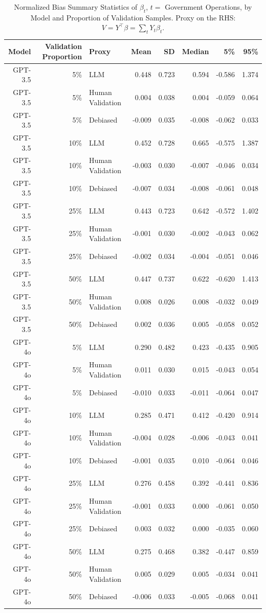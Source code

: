 \begin{table}

\caption{Normalized Bias Summary Statistics of $\beta_{t}$, $t=$ Government Operations, by Model and Proportion of Validation Samples.
      Proxy on the RHS: $V = Y^\top \beta = \sum_{t} Y_t \beta_t$.}
\centering
\begin{tabular}[t]{rrlrrrrr}
\toprule
Model & Validation Proportion & Proxy & Mean & SD & Median & 5\% & 95\%\\
\midrule
GPT-3.5 & 5\% & LLM & 0.448 & 0.723 & 0.594 & -0.586 & 1.374\\
GPT-3.5 & 5\% & Human Validation & 0.004 & 0.038 & 0.004 & -0.059 & 0.064\\
GPT-3.5 & 5\% & Debiased & -0.009 & 0.035 & -0.008 & -0.062 & 0.033\\
GPT-3.5 & 10\% & LLM & 0.452 & 0.728 & 0.665 & -0.575 & 1.387\\
GPT-3.5 & 10\% & Human Validation & -0.003 & 0.030 & -0.007 & -0.046 & 0.034\\
GPT-3.5 & 10\% & Debiased & -0.007 & 0.034 & -0.008 & -0.061 & 0.048\\
GPT-3.5 & 25\% & LLM & 0.443 & 0.723 & 0.642 & -0.572 & 1.402\\
GPT-3.5 & 25\% & Human Validation & -0.001 & 0.030 & -0.002 & -0.043 & 0.062\\
GPT-3.5 & 25\% & Debiased & -0.002 & 0.034 & -0.004 & -0.051 & 0.046\\
GPT-3.5 & 50\% & LLM & 0.447 & 0.737 & 0.622 & -0.620 & 1.413\\
GPT-3.5 & 50\% & Human Validation & 0.008 & 0.026 & 0.008 & -0.032 & 0.049\\
GPT-3.5 & 50\% & Debiased & 0.002 & 0.036 & 0.005 & -0.058 & 0.052\\
GPT-4o & 5\% & LLM & 0.290 & 0.482 & 0.423 & -0.435 & 0.905\\
GPT-4o & 5\% & Human Validation & 0.011 & 0.030 & 0.015 & -0.043 & 0.054\\
GPT-4o & 5\% & Debiased & -0.010 & 0.033 & -0.011 & -0.064 & 0.047\\
GPT-4o & 10\% & LLM & 0.285 & 0.471 & 0.412 & -0.420 & 0.914\\
GPT-4o & 10\% & Human Validation & -0.004 & 0.028 & -0.006 & -0.043 & 0.041\\
GPT-4o & 10\% & Debiased & -0.001 & 0.035 & 0.010 & -0.064 & 0.046\\
GPT-4o & 25\% & LLM & 0.276 & 0.458 & 0.392 & -0.441 & 0.836\\
GPT-4o & 25\% & Human Validation & -0.001 & 0.033 & 0.000 & -0.061 & 0.050\\
GPT-4o & 25\% & Debiased & 0.003 & 0.032 & 0.000 & -0.035 & 0.060\\
GPT-4o & 50\% & LLM & 0.275 & 0.468 & 0.382 & -0.447 & 0.859\\
GPT-4o & 50\% & Human Validation & 0.005 & 0.029 & 0.005 & -0.034 & 0.041\\
GPT-4o & 50\% & Debiased & -0.006 & 0.033 & -0.005 & -0.068 & 0.041\\
\bottomrule
\end{tabular}
\end{table}
